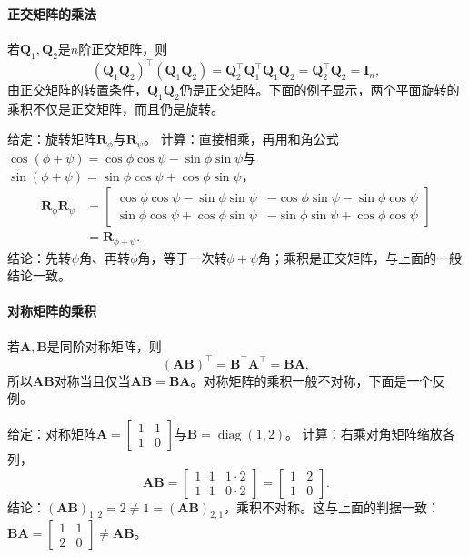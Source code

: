 \paragraph{正交矩阵的乘法}
若$\bm Q_1,\bm Q_2$是$n$阶正交矩阵，则
\[
 (\bm Q_1\bm Q_2)^\top(\bm Q_1\bm Q_2)=\bm Q_2^\top\bm Q_1^\top\bm Q_1\bm Q_2=\bm Q_2^\top\bm Q_2=\bm I_n,
\]
由正交矩阵的转置条件，$\bm Q_1\bm Q_2$仍是正交矩阵。下面的例子显示，两个平面旋转的乘积不仅是正交矩阵，而且仍是旋转。
\begin{example}[两个平面旋转的乘积]
\label{ex:ls-rotation-composition}
给定：旋转矩阵$\bm R_\phi$与$\bm R_\psi$。
计算：直接相乘，再用和角公式$\cos(\phi+\psi)=\cos\phi\cos\psi-\sin\phi\sin\psi$与$\sin(\phi+\psi)=\sin\phi\cos\psi+\cos\phi\sin\psi$，
\[
 \begin{aligned}
 \bm R_\phi\bm R_\psi
 &=\begin{bmatrix}\cos\phi\cos\psi-\sin\phi\sin\psi&-\cos\phi\sin\psi-\sin\phi\cos\psi\\\sin\phi\cos\psi+\cos\phi\sin\psi&-\sin\phi\sin\psi+\cos\phi\cos\psi\end{bmatrix}\\
 &=\bm R_{\phi+\psi}.
 \end{aligned}
\]
结论：先转$\psi$角、再转$\phi$角，等于一次转$\phi+\psi$角；乘积是正交矩阵，与上面的一般结论一致。
\end{example}

\paragraph{对称矩阵的乘积}
若$\bm A,\bm B$是同阶对称矩阵，则
\[
 (\bm A\bm B)^\top=\bm B^\top\bm A^\top=\bm B\bm A,
\]
所以$\bm A\bm B$对称当且仅当$\bm A\bm B=\bm B\bm A$。对称矩阵的乘积一般不对称，下面是一个反例。
\begin{example}[反例：两个对称矩阵的乘积不对称]
\label{ex:ls-symmetric-product-not-symmetric}
给定：对称矩阵$\bm A=\left[\begin{smallmatrix}1&1\\1&0\end{smallmatrix}\right]$与$\bm B=\operatorname{diag}(1,2)$。
计算：右乘对角矩阵缩放各列，
\[
 \bm A\bm B=\begin{bmatrix}1\cdot1&1\cdot2\\1\cdot1&0\cdot2\end{bmatrix}=\begin{bmatrix}1&2\\1&0\end{bmatrix}.
\]
结论：$(\bm A\bm B)_{1,2}=2\neq1=(\bm A\bm B)_{2,1}$，乘积不对称。这与上面的判据一致：$\bm B\bm A=\left[\begin{smallmatrix}1&1\\2&0\end{smallmatrix}\right]\neq\bm A\bm B$。
\end{example}

